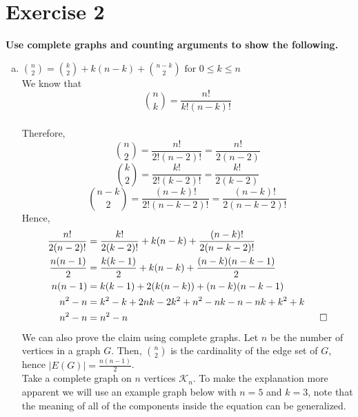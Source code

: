 \section*{Exercise 2}
\textbf{Use complete graphs and counting arguments to show the following.}
\begin{enumerate}[a)]
    \item $\binom{n}{2} = \binom{k}{2} + k(n-k) + \binom{n-k}{2} \text{ for } 0 \leq k \leq n $ \\
    \linebreak 
    We know that \begin{equation}\binom{n}{k} = \frac{n!}{k!(n-k)!}\end{equation} \\ 
    Therefore, \\ 
    \linebreak 
    \begin{equation}
        \binom{n}{2} = \frac{n!}{2!(n-2)!} = \frac{n!}{2(n-2)}
    \end{equation}
    \begin{equation}
        \binom{k}{2} = \frac{k!}{2!(k-2)!} = \frac{k!}{2(k-2)}
    \end{equation}
    \begin{equation}
        \binom{n-k}{2} = \frac{(n-k)!}{2!(n-k-2)!} = \frac{(n-k)!}{2(n-k-2)!}
    \end{equation}
    Hence, 
    \begin{align}
    \notag
        \frac{n!}{2(n-2)!} &= \frac{k!}{2(k-2)!} + k(n-k) + \frac{(n-k)!}{2(n-k-2)!} \\
        \notag
        \frac{n(n-1)}{2} &= \frac{k(k-1)}{2} + k(n-k) + \frac{(n-k)(n-k-1)}{2} \\
        \notag
        n(n-1) &= k(k-1) + 2(k(n-k)) + (n-k)(n-k-1) \\
        \notag
        n^2 - n &= k^2 - k + 2nk - 2k^2 + n^2 - nk - n - nk + k^2 + k \\
        n^2 - n &= n^2 - n \hspace{7cm} \square
    \end{align}
    We can also prove the claim using complete graphs. Let $n$ be the number of vertices in a graph $G$. Then, $\binom{n}{2}$ is the cardinality of the edge set of $G$, hence $|E(G)| = \frac{n(n-1)}{2}$. \\
    \linebreak 
    Take a complete graph on $n$ vertices $\mathcal{K}_n$. To make the explanation more apparent we will use an example graph below with $n = 5$ and $k = 3$, note that the meaning of all of the components inside the equation can be generalized.

\end{enumerate}
